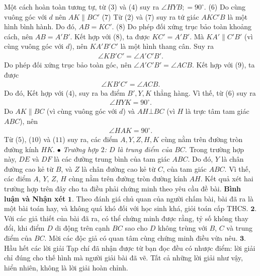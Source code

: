 \begin{multicols}{2}
	\vskip 0.05cm
	Một cách hoàn toàn tương tự, từ ($3$) và ($4$) suy ra  $\angle HYB; = 90^\circ$. \hfill  ($6$)
	\vskip 0.05cm
	Do cùng vuông góc với $d$ nên $AK \parallel BC'$ \hfill ($7$)
	\vskip 0.05cm
	Từ ($2$) và ($7$) suy ra tứ giác $AKC'B$ là một hình bình hành. Do  đó, $AB = KC'$. \hfill ($8$)
	\vskip 0.05cm
	Do phép đối xứng trục bảo toàn khoảng cách, nên $AB = A'B'$.  Kết hợp với ($8$), ta được $KC' = A'B'$. Mà  $KA' \parallel C'B'$ (vì cùng vuông góc với $d$), nên $KA'B'C'$  là một hình thang cân. Suy ra
	\begin{align*}
		\angle KB'C' = \angle A'C'B'. \tag{$9$}
	\end{align*}
	Do phép đối xứng trục bảo toàn góc, nên $\angle A'C'B' = \angle ACB.$   Kết hợp với ($9$), ta được
	\begin{align*}
		\angle KB'C' = \angle ACB.	
	\end{align*}
	Do đó,  Kết hợp với ($4$), suy ra ba điểm  $B', Y, K$ thẳng hàng. Vì thế, từ ($6$) suy ra
	\begin{align*}
		\angle HYK = {90^\circ}. \tag{$10$}
	\end{align*}
	Do $AK \parallel BC$  (vì cùng vuông góc với $d$) và $AH \bot BC$ (vì $H$ là trực tâm tam giác $ABC$), nên
	\begin{align*}
		\angle HAK = 90^\circ. \tag{$11$}
	\end{align*}
	Từ ($5$), ($10$) và ($11$) suy ra, các điểm $A, Y, Z, H, K$ cùng nằm trên đường tròn đường kính $HK$.
	\vskip 0.05cm
	$\bullet$ \textit{Trường hợp $2$: $D$ là trung điểm của $BC$}.
	\vskip 0.05cm
	Trong trường hợp này, $DE$ và $DF$ là các đường trung bình của tam giác $ABC$. Do đó, $Y$ là chân đường cao kẻ từ $B$, và $Z$ là chân đường cao kẻ từ $C$, của tam giác $ABC$. Vì thế, các điểm $A$, $Y$, $Z$, $H$ cùng nằm trên đường tròn đường kính $AH$.
	\vskip 0.05cm
	Kết quả xét hai trường hợp trên đây cho ta điều phải chứng minh theo yêu cầu đề bài.
	\vskip 0.05cm
	\textbf{\color{thachthuctoanhoc}Bình luận và Nhận xét}
	\vskip 0.05cm
	$\pmb{1.}$ Theo đánh giá chủ quan của người chấm bài, bài đã ra là một bài toán hay, và không quá khó đối với học sinh khá, giỏi toán cấp THCS.
	\vskip 0.05cm
	$\pmb{2.}$ Với các giả thiết của bài đã ra, có thể chứng minh được rằng, tỷ số   không thay đổi, khi điểm $D$ di động trên cạnh $BC$ sao cho $D$ không trùng với $B$, $C$ và trung điểm của $BC$. Mời các độc giả có quan tâm cùng chứng minh điều vừa nêu.
	\vskip 0.05cm
	$\pmb{3.}$ Hầu hết các lời giải Tạp chí đã nhận được từ bạn đọc đều có nhược điểm: lời giải chỉ đúng cho thế hình mà người giải bài đã vẽ. Tất cả những lời giải như vậy, hiển nhiên, không là lời giải hoàn chỉnh.

\end{multicols}
